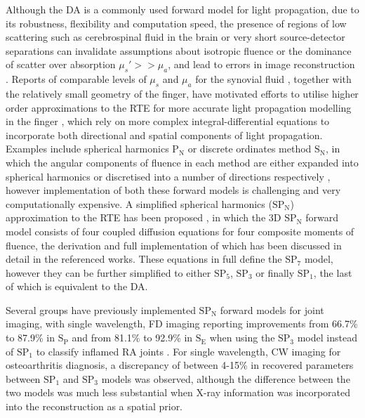 \documentclass[twoside]{bhamthesis}
\theoremstyle{definition}
\begin{document}
Although the DA is a commonly used forward model for light propagation, due to its robustness, flexibility and computation speed, the presence of regions of low scattering such as cerebrospinal fluid in the brain or very short source-detector separations can invalidate assumptions about isotropic fluence or the dominance of scatter over absorption $\mu_s'>>\mu_a$, and lead to errors in image reconstruction \cite{dehghani1999photon,hielscher1998comparison}. Reports of comparable levels of $\mu_s$ and $\mu_a$ for the synovial fluid \cite{prapavat1995evaluation}, together with the relatively small geometry of the finger, have motivated efforts to utilise higher order approximations to the RTE for more accurate light propagation modelling in the finger \cite{yuan2009comparison,montejo2014computational}, which rely on more complex integral-differential equations to incorporate both directional and spatial components of light propagation. Examples include spherical harmonics $\mathrm{P_N}$ or discrete ordinates method $\mathrm{S_N}$, in which the angular components of fluence in each method are either expanded into spherical harmonics \cite{aydin2002comparison} or discretised into a number of directions respectively \cite{hielscher1998comparison}, however implementation of both these forward models is challenging and very computationally expensive. A simplified spherical harmonics ($\mathrm{SP_N}$) approximation to the RTE has been proposed \cite{klose2006light}, in which the 3D $\mathrm{SP_N}$ forward model consists of four coupled diffusion equations for four composite moments of fluence, the derivation and full implementation of which has been discussed in detail in the referenced works. These equations in full define the $\mathrm{SP_7}$ model, however they can be further simplified to either $\mathrm{SP_5}$, $\mathrm{SP_3}$ or finally $\mathrm{SP_1}$, the last of which is equivalent to the DA.

Several groups have previously implemented $\mathrm{SP_N}$ forward models for joint imaging, with single wavelength, FD imaging reporting improvements from 66.7\% to 87.9\% in $\mathrm{S_P}$ and from 81.1\% to 92.9\% in $\mathrm{S_E}$ when using the $\mathrm{SP_3}$ model instead of $\mathrm{SP_1}$ to classify inflamed RA joints \cite{montejo2014computational}. For single wavelength, CW imaging for osteoarthritis diagnosis, a discrepancy of between 4-15\% in recovered parameters between $\mathrm{SP_1}$ and $\mathrm{SP_3}$ models \cite{yuan2009comparison} was observed, although the difference between the two models was much less substantial when X-ray information was incorporated into the reconstruction as a spatial prior. 
\end{document}
